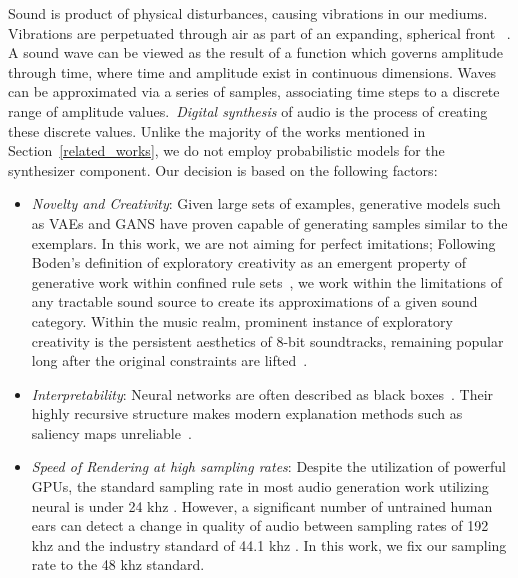 \documentclass[runningheads,a4paper]{llncs}
\begin{document}
Sound is product of physical disturbances, causing vibrations in our mediums. Vibrations are perpetuated through air as part of an expanding, spherical front ~\cite{cook1999chap4}. A sound wave can be viewed as the result of a function which governs amplitude through time, where time and amplitude exist in continuous dimensions. Waves can be approximated via a series of samples, associating time steps to a discrete range of amplitude values.~\textit{Digital synthesis} of audio is the process of creating these discrete values.
Unlike the majority of the works mentioned in Section~\ref{related_works}, we do not employ probabilistic models for the synthesizer component. Our decision is based on the following factors:
\begin{itemize}
    \item \textit{Novelty and Creativity}: Given large sets of examples, generative models such as VAEs and GANS have proven capable of generating samples similar to the exemplars. In this work, we are not aiming for perfect imitations; Following Boden's definition of exploratory creativity as an emergent property of generative work within confined rule sets~\cite{boden2009computer}, we work within the limitations of any tractable sound source to create its  approximations of a given sound category. Within the music realm, prominent instance of exploratory creativity is the persistent aesthetics of 8-bit soundtracks, remaining popular long after the original constraints are lifted~\cite{collins2007loop}.
    \item \textit{Interpretability}: Neural networks are often described as black boxes~\cite{basheer2000artificial}. Their highly recursive structure makes modern explanation methods such as saliency maps unreliable~\cite{rudin2019stop}.  
    \item \textit{Speed of Rendering at high sampling rates}: Despite the utilization of powerful GPUs, the standard sampling rate in most audio generation work utilizing neural is under 24 khz \cite{yamamoto2020parallel,oord2017parallel,aouameur2019neural,ramires2020neural}. However, a significant number of untrained human ears can detect a change in quality of audio between sampling rates of 192 khz and the industry standard of 44.1 khz \cite{reiss2016meta}. In this work, we fix our sampling rate to the 48 khz standard. 
\end{itemize}

\end{document}
